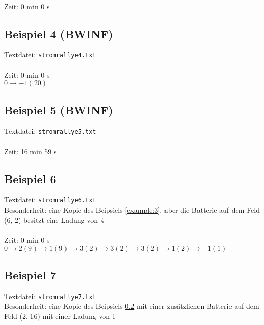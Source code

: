 \documentclass[a4paper,10pt,ngerman]{scrartcl}
\begin{document}
\noindent
{}\\

\noindent
Zeit: 0 min 0 s

\subsection{Beispiel 4 (BWINF)}\label{example:4}
Textdatei: \texttt{stromrallye4.txt}\\

\noindent
{}\\

\noindent
Zeit: 0 min 0 s\\

\noindent
$0 \rightarrow -1(20)$

\subsection{Beispiel 5 (BWINF)}\label{example:5}
Textdatei: \texttt{stromrallye5.txt}\\

\noindent
{}\\

\noindent
Zeit: 16 min 59 s

\subsection{Beispiel 6}\label{example:6}
Textdatei: \texttt{stromrallye6.txt}\\
Besonderheit: eine Kopie des Beipsiels \ref{example:3}, aber die Batterie auf dem Feld (6, 2) besitzt eine Ladung von 4\\

\noindent
{}\\

\noindent
Zeit: 0 min 0 s\\

\noindent
$0 \rightarrow2(9) \rightarrow 1(9) \rightarrow 3(2) \rightarrow 3(2) \rightarrow 3(2) \rightarrow 1(2) \rightarrow -1(1)$

\noindent
\subsection{Beispiel 7}\label{example:7}
Textdatei: \texttt{stromrallye7.txt}\\
Besonderheit: eine Kopie des Beipsiels \ref{example:5} mit einer zusätzlichen Batterie auf dem Feld (2, 16) mit einer Ladung von 1\\
\end{document}
